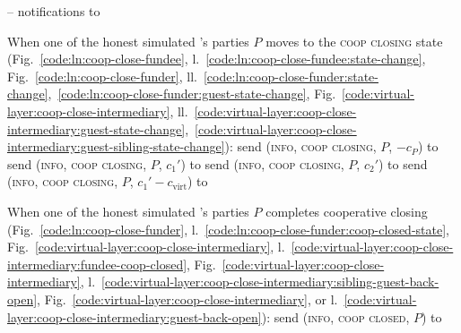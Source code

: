 \begin{center}
\begin{simulatorbox}{\simulator{} -- notifications to \fchan}
\begin{algorithmic}[1]
      \State When one of the honest simulated \fchan's parties $P$ moves to the
      \textsc{coop closing} state
      (Fig.~\ref{code:ln:coop-close-fundee},
      l.~\ref{code:ln:coop-close-fundee:state-change},
      Fig.~\ref{code:ln:coop-close-funder},
      ll.~\ref{code:ln:coop-close-funder:state-change},~\ref{code:ln:coop-close-funder:guest-state-change},
      Fig.~\ref{code:virtual-layer:coop-close-intermediary},
      ll.~\ref{code:virtual-layer:coop-close-intermediary:guest-state-change},~\ref{code:virtual-layer:coop-close-intermediary:guest-sibling-state-change}):
      \Indent
         
          \State send (\textsc{info}, \textsc{coop closing}, $P$, $-c_P$) to
          \fchan{} 
         
          \State send (\textsc{info}, \textsc{coop closing}, $P$, $c_1'$) to
          \fchan
          \State send (\textsc{info}, \textsc{coop closing}, $P$, $c_2'$) to
          \fchan
          \State send (\textsc{info}, \textsc{coop closing}, $P$, $c_1' -
          c_{\mathrm{virt}}$) to \fchan
        \EndIf
      \EndIndent
      \Statex

      \State When one of the honest simulated \fchan's parties $P$ completes
      cooperative closing
      (Fig.~\ref{code:ln:coop-close-funder},
      l.~\ref{code:ln:coop-close-funder:coop-closed-state},
      Fig.~\ref{code:virtual-layer:coop-close-intermediary},
      l.~\ref{code:virtual-layer:coop-close-intermediary:fundee-coop-closed},
      Fig.~\ref{code:virtual-layer:coop-close-intermediary},
      l.~\ref{code:virtual-layer:coop-close-intermediary:sibling-guest-back-open},
      Fig.~\ref{code:virtual-layer:coop-close-intermediary}, or
      l.~\ref{code:virtual-layer:coop-close-intermediary:guest-back-open}):
      \Indent
        \State send (\textsc{info}, \textsc{coop closed}, $P$) to \fchan
      \EndIndent
      \Statex


\end{algorithmic}
\end{simulatorbox}
\end{center}
